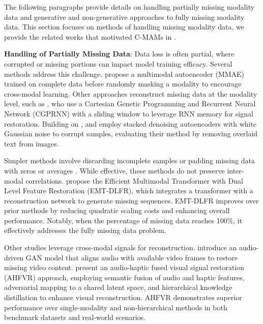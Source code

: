 
The following paragraphs provide details on handling partially missing modality data and generative and non-generative approaches to fully missing modality data. This section focuses on methods of handling missing modality data, we provide the related works that motivated C-MAMs in .

\textbf{Handling of Partially Missing Data}: Data loss is often partial, where corrupted or missing portions can impact model training efficacy. Several methods address this challenge. \citet{8273601} propose a multimodal autoencoder (MMAE) trained on complete data before randomly masking a modality to encourage cross-modal learning. Other approaches reconstruct missing data at the modality level, such as \citet{10.1007/978-3-030-03493-1_62}, who use a Cartesian Genetic Programming and Recurrent Neural Network (CGPRNN) with a sliding window to leverage RNN memory for signal restoration. Building on \cite{8273601}, \citet{NIPS2012_6cdd60ea} and \citet{9099281} employ stacked denoising autoencoders with white Gaussian noise to corrupt samples, evaluating their method by removing overlaid text from images.

Simpler methods involve discarding incomplete samples or padding missing data with zeros or averages \cite{10.1145/3395035.3425202, ma2021maximum, 9258396}. While effective, these methods do not preserve inter-modal correlations. \citet{10122560} propose the Efficient Multimodal Transformer with Dual Level Feature Restoration (EMT-DLFR), which integrates a transformer with a reconstruction network to generate missing sequences. EMT-DLFR improves over prior methods by reducing quadratic scaling costs and enhancing overall performance. Notably, when the percentage of missing data reaches 100\%, it effectively addresses the fully missing data problem.

Other studies leverage cross-modal signals for reconstruction. \citet{9563268} introduce an audio-driven GAN model that aligns audio with available video frames to restore missing video content. \citet{9842374} present an audio-haptic fused visual signal restoration (AHFVR) approach, employing semantic fusion of audio and haptic features, adversarial mapping to a shared latent space, and hierarchical knowledge distillation to enhance visual reconstruction. AHFVR demonstrates superior performance over single-modality and non-hierarchical methods in both benchmark datasets and real-world scenarios.

